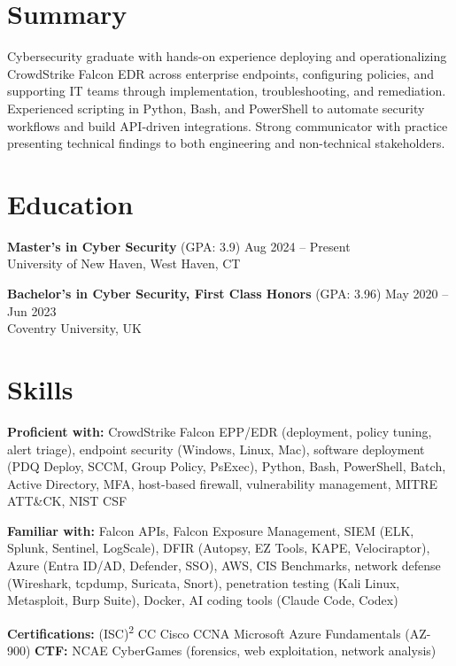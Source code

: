 \documentclass{resume2}
\begin{document}
\makeheader

\section{Summary}
Cybersecurity graduate with hands-on experience deploying and operationalizing CrowdStrike Falcon EDR across enterprise endpoints, configuring policies, and supporting IT teams through implementation, troubleshooting, and remediation. Experienced scripting in Python, Bash, and PowerShell to automate security workflows and build API-driven integrations. Strong communicator with practice presenting technical findings to both engineering and non-technical stakeholders.

\section{Education}

\textbf{Master's in Cyber Security} (GPA: 3.9) \hfill Aug 2024 -- Present\\
University of New Haven, West Haven, CT

\medskip
\textbf{Bachelor's in Cyber Security, First Class Honors} (GPA: 3.96) \hfill May 2020 -- Jun 2023\\
Coventry University, UK

\section{Skills}

\textbf{Proficient with:} CrowdStrike Falcon EPP/EDR (deployment, policy tuning, alert triage), endpoint security (Windows, Linux, Mac), software deployment (PDQ Deploy, SCCM, Group Policy, PsExec), Python, Bash, PowerShell, Batch, Active Directory, MFA, host-based firewall, vulnerability management, MITRE ATT\&CK, NIST CSF

\smallskip
\textbf{Familiar with:} Falcon APIs, Falcon Exposure Management, SIEM (ELK, Splunk, Sentinel, LogScale), DFIR (Autopsy, EZ Tools, KAPE, Velociraptor), Azure (Entra ID/AD, Defender, SSO), AWS, CIS Benchmarks, network defense (Wireshark, tcpdump, Suricata, Snort), penetration testing (Kali Linux, Metasploit, Burp Suite), Docker, AI coding tools (Claude Code, Codex)

\smallskip
\textbf{Certifications:} (ISC)\textsuperscript{2} CC \textbullet{} Cisco CCNA \textbullet{} Microsoft Azure Fundamentals (AZ-900) \quad \textbf{CTF:} NCAE CyberGames (forensics, web exploitation, network analysis)
\end{document}
